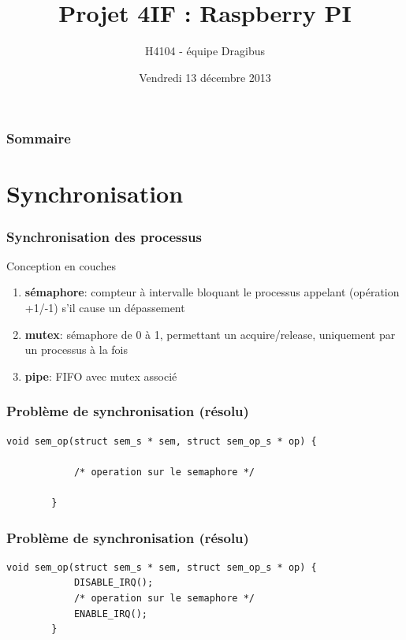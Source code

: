 \documentclass{beamer}
\title[Presentation SEA]{Projet 4IF : Raspberry PI}
\author{H4104 - équipe Dragibus}
\institute{INSA de Lyon}
\date{Vendredi 13 décembre 2013}
\begin{document}
\begin{frame}
    \titlepage
\end{frame}

\begin{frame}
    \frametitle{Sommaire}
    \tableofcontents
\end{frame}

\section{Synchronisation}

\begin{frame}
    \frametitle{Synchronisation des processus}

    \begin{center}
        \huge Conception en couches
    \end{center}

    \begin{enumerate}
        \item<2-> \textbf{sémaphore}: compteur à intervalle bloquant le
            processus appelant (opération +1/-1) s'il cause un dépassement
        \item<3-> \textbf{mutex}: sémaphore de 0 à 1, permettant un
            acquire/release, uniquement par un processus à la fois
        \item<4-> \textbf{pipe}: FIFO avec mutex associé
    \end{enumerate}
\end{frame}

\begin{frame}[fragile]
    \frametitle{Problème de synchronisation (résolu)}

    \begin{lstlisting}[caption=Opération sur un sémaphore]
        void sem_op(struct sem_s * sem, struct sem_op_s * op) {

            /* operation sur le semaphore */

        }
    \end{lstlisting}
\end{frame}

\begin{frame}[fragile]
    \frametitle{Problème de synchronisation (résolu)}

    \begin{lstlisting}[caption=Opération {\bfseries atomique} sur un sémaphore]
        void sem_op(struct sem_s * sem, struct sem_op_s * op) {
            DISABLE_IRQ();
            /* operation sur le semaphore */
            ENABLE_IRQ();
        }
    \end{lstlisting}
\end{frame}
\end{document}
